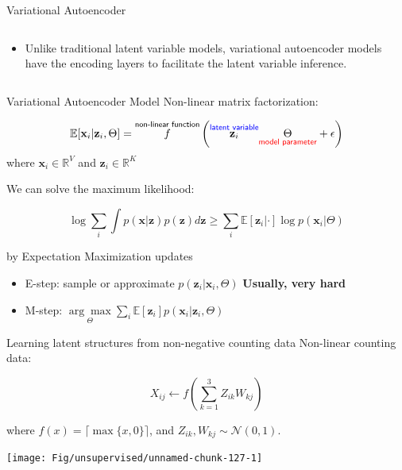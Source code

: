 \documentclass[
  ignorenonframetext,
  aspectratio=169]{beamer}
\providecommand{\tightlist}{%
  \setlength{\itemsep}{0pt}\setlength{\parskip}{0pt}}
\begin{document}
\begin{frame}{Variational Autoencoder}
\begin{columns}[T]
\begin{column}{.45\textwidth}
\normalsize

\begin{itemize}
\tightlist
\item
  Unlike traditional latent variable models, variational autoencoder
  models have the encoding layers to facilitate the latent variable
  inference.
\end{itemize}
\end{column}
\end{columns}
\end{frame}

\begin{frame}{Variational Autoencoder Model}
\protect\hypertarget{variational-autoencoder-model}{}
Non-linear matrix factorization:

\[\mathbb{E}\!\left[\mathbf{x}_{i} | \mathbf{z}_{i}, \Theta\right] = \overset{\textsf{non-linear function}}{f}
\left(\overset{\textsf{\color{blue} latent variable}}{\mathbf{z}_{i}} 
\underset{\textsf{\color{red} model parameter}}{\Theta} + \epsilon
\right)\] where \(\mathbf{x}_{i} \in \mathbb{R}^{V}\) and
\(\mathbf{z}_{i} \in \mathbb{R}^{K}\)

We can solve the maximum likelihood:

\[\log \sum_{i} \int p(\mathbf{x} | \mathbf{z}) p(\mathbf{z}) d \mathbf{z} 
\ge \sum_{i} \mathbb{E}\!\left[\mathbf{z}_{i}|\cdot\right] \log p(\mathbf{x}_{i}| \Theta)\]

by Expectation Maximization updates

\begin{itemize}
\item
  E-step: sample or approximate
  \(p(\mathbf{z}_{i}|\mathbf{x}_{i},\Theta)\) \textbf{Usually, very
  hard}
\item
  M-step:
  \(\underset{\Theta}{\arg\max} \sum_{i} \mathbb{E}\!\left[\mathbf{z}_{i}\right] p(\mathbf{x}_{i}| \mathbf{z}_{i}, \Theta)\)
\end{itemize}
\end{frame}

\begin{frame}{Learning latent structures from non-negative counting
data}
\protect\hypertarget{learning-latent-structures-from-non-negative-counting-data}{}
Non-linear counting data:

\[X_{ij} \gets f\left( \sum_{k=1}^{3} Z_{ik} W_{kj} \right)\]

where \(f(x) = \lceil \max\{x, 0\} \rceil\), and
\(Z_{ik},W_{kj} \sim \mathcal{N}\!\left(0,1\right)\).

\scriptsize

\normalsize

\scriptsize

\begin{center}\texttt{[image: Fig/unsupervised/unnamed-chunk-127-1]} \end{center}

\normalsize
\end{frame}
\end{document}
